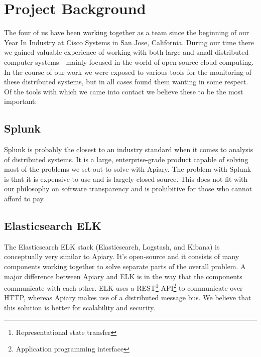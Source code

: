 \section{Project Background}

The four of us have been working together as a team since the beginning of our
Year In Industry at Cisco Systems in San Jose, California. During our time there
we gained valuable experience of working with both large and small distributed
computer systems - mainly focused in the world of open-source cloud computing.
In the course of our work we were exposed to various tools for the monitoring of
these distributed systems, but in all cases found them wanting in some respect.
Of the tools with which we came into contact we believe these to be the most
important:

\subsection{Splunk}

Splunk\cite{splunk} is probably the closest to an industry standard when it comes to
analysis of distributed systems. It is a large, enterprise-grade product capable
of solving most of the problems we set out to solve with Apiary. The problem
with Splunk is that it is expensive to use and is largely closed-source. This
does not fit with our philosophy on software transparency and is prohibitive for
those who cannot afford to pay.

\subsection{Elasticsearch ELK}

The Elasticsearch ELK\cite{elk} stack (Elasticsearch, Logstash, and Kibana) is
conceptually very similar to Apiary. It’s open-source and it consists of many
components working together to solve separate parts of the overall problem. A
major difference between Apiary and ELK is in the way that the components
communicate with each other. ELK uses a REST\footnote{Representational state
transfer} API\footnote{Application programming interface} to communicate over HTTP,
whereas Apiary makes use of a distributed message bus. We believe that this
solution is better for scalability and security.
